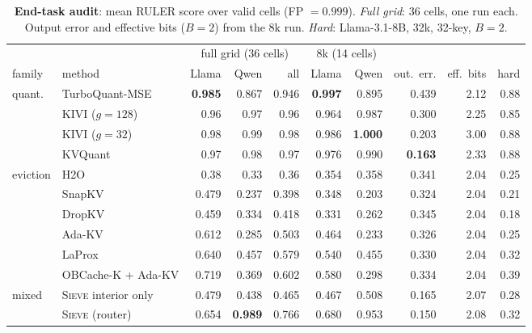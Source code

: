 \documentclass{article}
\newif\ifshowest \showesttrue
\DeclareRobustCommand{\est}[1]{\ifshowest{\color{estcol}#1}\else---\fi}
\DeclareRobustCommand{\estalt}[2]{\ifshowest#1\else#2\fi}
\newcommand{\sieve}{\textsc{Sieve}}
\theoremstyle{definition}
\begin{document}
\begin{table}[t]
\centering
\footnotesize
\setlength{\tabcolsep}{2.6pt}
\caption{\textbf{End-task audit}: mean RULER score over valid cells (FP $=0.999$). \emph{Full grid}: 36 cells, one run each. 
Output error and effective bits ($B=2$) from the 8k run. \emph{Hard}: Llama-3.1-8B, 32k, 32-key, $B=2$. 
}
\label{tab:endtask}
\begin{tabular}{@{}llrrrrrrrr@{}}
\toprule
& & \multicolumn{3}{c}{full grid (36 cells)} & \multicolumn{2}{c}{8k (14 cells)} & & & \\
\cmidrule(lr){3-5}\cmidrule(lr){6-7}
family & method & Llama & Qwen & all & Llama & Qwen & out.\ err. & eff.\ bits & hard \\
\midrule
\multirow{4}{*}{quant.} & TurboQuant-MSE & \textbf{0.985} & 0.867 & 0.946 & \textbf{0.997} & 0.895 & 0.439 & 2.12 & \est{0.88} \\
 & KIVI ($g{=}128$) & \est{0.96} & \est{0.97} & \est{0.96} & 0.964 & 0.987 & 0.300 & 2.25 & \est{0.85} \\
 & KIVI ($g{=}32$) & \est{0.98} & \est{0.99} & \est{0.98} & 0.986 & \textbf{1.000} & 0.203 & 3.00 & \est{0.88} \\
 & KVQuant & \est{0.97} & \est{0.98} & \est{0.97} & 0.976 & 0.990 & \textbf{0.163} & 2.33 & \est{0.88} \\
\midrule
\multirow{6}{*}{eviction} & H2O & \est{0.38} & \est{0.33} & \est{0.36} & 0.354 & 0.358 & 0.341 & 2.04 & \est{0.25} \\
 & SnapKV & 0.479 & 0.237 & 0.398 & 0.348 & 0.203 & 0.324 & 2.04 & \est{0.21} \\
 & DropKV & 0.459 & 0.334 & 0.418 & 0.331 & 0.262 & 0.345 & 2.04 & \est{0.18} \\
 & Ada-KV & 0.612 & 0.285 & 0.503 & 0.464 & 0.233 & 0.326 & 2.04 & \est{0.25} \\
 & LaProx & 0.640 & 0.457 & 0.579 & 0.540 & 0.455 & 0.330 & 2.04 & \est{0.32} \\
 & OBCache-K + Ada-KV & 0.719 & 0.369 & 0.602 & 0.580 & 0.298 & 0.334 & 2.04 & \est{0.39} \\
\midrule
\multirow{2}{*}{mixed} & \sieve{} interior only & 0.479 & 0.438 & 0.465 & 0.467 & 0.508 & 0.165 & 2.07 & \est{0.28} \\
 & \sieve{} (router) & 0.654 & \textbf{0.989} & 0.766 & 0.680 & 0.953 & 0.150 & 2.08 & \est{0.32} \\
\bottomrule
\end{tabular}
\vspace{-2mm}
\end{table}
\end{document}
